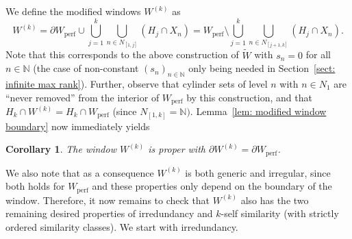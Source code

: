 \documentclass[titlepage,reqno,10pt]{amsart}
\newtheorem{lemma}[theorem]{Lemma}
\newtheorem{corollary}[theorem]{Corollary}
\theoremstyle{definition}
\def\N{{\mathbb N}}
\begin{document}



We define the modified windows $W^{(k)}$ as 
$$ W^{(k)}=\partial W_{\mathrm{perf}}\cup \bigcup_{j=1}^k\bigcup_{n\in N_{[1,j]}}(H_j\cap X_n) = W_{\mathrm{perf}} \setminus \bigcup_{j=1}^k \bigcup_{n\in N_{[j+1,k]}} (H_j\cap X_n).  $$
Note that this corresponds to the above construction of $\widetilde{W}$ with $s_n=0$ for all $n\in\N$ (the case of non-constant $(s_n)_{n\in\N}$ only being needed in Section~\ref{sect: infinite max rank}). Further, observe that cylinder sets of level $n$ with $n\in N_1$ are ``never removed'' from the interior of $W_\mathrm{perf}$ by this construction, and that $H_k \cap W^{(k)} = H_k \cap W_{\mathrm{perf}}$ (since $N_{[1,k]}=\N)$.
Lemma~\ref{lem: modified window boundary}  now immediately yields 
\begin{corollary} \label{cor: W^(k) boundary}
The window $W^{(k)}$ is proper with $\partial W^{(k)} = \partial W_{\mathrm{perf}}$.
\end{corollary}
We also note that as a consequence $W^{(k)}$ is both generic and irregular, since both holds for $W_\mathrm{perf}$ and these properties only depend on the boundary of the window. Therefore, it now remains to check that $W^{(k)}$ also has the two remaining desired properties of irredundancy and $k$-self similarity (with strictly ordered similarity classes). We start with irredundancy. 
\end{document}
